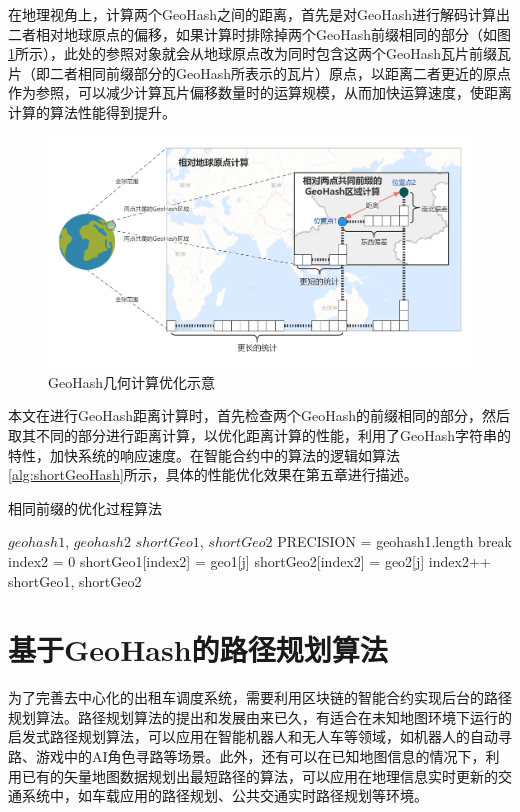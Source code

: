 在地理视角上，计算两个GeoHash之间的距离，首先是对GeoHash进行解码计算出二者相对地球原点的偏移，如果计算时排除掉两个GeoHash前缀相同的部分（如图\ref{fig:calBetter}所示），此处的参照对象就会从地球原点改为同时包含这两个GeoHash瓦片前缀瓦片（即二者相同前缀部分的GeoHash所表示的瓦片）原点，以距离二者更近的原点作为参照，可以减少计算瓦片偏移数量时的运算规模，从而加快运算速度，使距离计算的算法性能得到提升。

\begin{figure}[h]
  \centering
  \includegraphics[width=1.0\textwidth]{figures/GeoHash计算优化}
  \caption{GeoHash几何计算优化示意}\label{fig:calBetter}
\end{figure}

本文在进行GeoHash距离计算时，首先检查两个GeoHash的前缀相同的部分，然后取其不同的部分进行距离计算，以优化距离计算的性能，利用了GeoHash字符串的特性，加快系统的响应速度。在智能合约中的算法的逻辑如算法\ref{alg:shortGeoHash}所示，具体的性能优化效果在第五章进行描述。

\begin{algorithm}[h]
  \caption{相同前缀的优化过程算法}
  \label{alg:shortGeoHash}
  \begin{algorithmic}[1]
  \REQUIRE $geohash1$, $geohash2$
  \ENSURE $shortGeo1$, $shortGeo2$
  \STATE PRECISION = geohash1.length
      \STATE break
    \ENDIF
  \ENDFOR
  \STATE index2 = 0
    \STATE shortGeo1[index2] = geo1[j]
    \STATE shortGeo2[index2] = geo2[j]
    \STATE index2++
  \ENDFOR
  \RETURN shortGeo1, shortGeo2
  \end{algorithmic}
\end{algorithm}

\section{基于GeoHash的路径规划算法}
为了完善去中心化的出租车调度系统，需要利用区块链的智能合约实现后台的路径规划算法。路径规划算法的提出和发展由来已久，有适合在未知地图环境下运行的启发式路径规划算法，可以应用在智能机器人和无人车等领域，如机器人的自动寻路、游戏中的AI角色寻路等场景。此外，还有可以在已知地图信息的情况下，利用已有的矢量地图数据规划出最短路径的算法，可以应用在地理信息实时更新的交通系统中，如车载应用的路径规划、公共交通实时路径规划等环境。


